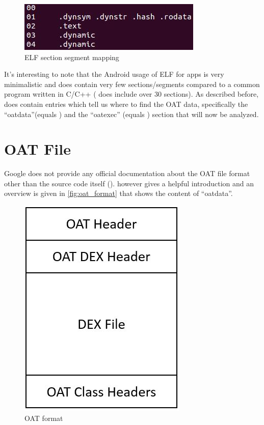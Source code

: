 \begin{figure}[htb]
  \centering
  \includegraphics[scale=0.7]{figures/section_segment_mapping}
  \caption[ELF section segment mapping]{ELF section segment mapping}
  \label{fig:sections_segments_mapping}
\end{figure}

It's interesting to note that the Android usage of ELF for apps
is very minimalistic and does contain very few sections/segments
compared to a common program written in C/C++ (
does include over 30 sections). As described before,
 does contain entries which tell us where to find
the OAT data, specifically the ``oatdata''(equals )
and the ``oatexec'' (equals )
section that will now be analyzed.

\section{OAT File}\label{section:oat_file}
Google does not provide any official documentation about the OAT
file format other than the source code itself
(). \parencite{hiding_behind_art}
however gives a helpful introduction and an overview is given
in \autoref{fig:oat_format} that shows the content of ``oatdata''.

\begin{figure}[htb]
  \centering
  \includegraphics[scale=0.5]{figures/oat_format}
  \caption[OAT format]{OAT format}
  \label{fig:oat_format}
\end{figure}

